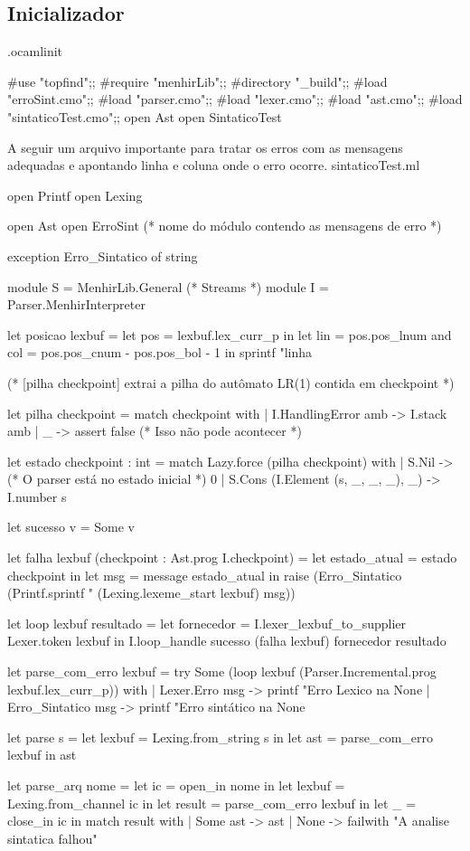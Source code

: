 \documentclass[12pt,a4paper,twoside]{report}
\begin{document}
\subsection{Inicializador} .ocamlinit
\begin{terminal}

#use "topfind";;
#require "menhirLib";;
#directory "_build";;
#load "erroSint.cmo";;
#load "parser.cmo";;
#load "lexer.cmo";;
#load "ast.cmo";;
#load "sintaticoTest.cmo";;
open Ast
open SintaticoTest

\end{terminal}
A seguir um arquivo importante para tratar os erros com as mensagens adequadas e apontando linha e coluna onde o erro ocorre.
sintaticoTest.ml
\begin{terminal}
open Printf
open Lexing

open Ast
open ErroSint (* nome do módulo contendo as mensagens de erro *)

exception Erro_Sintatico of string
    
module S = MenhirLib.General (* Streams *)
module I = Parser.MenhirInterpreter

let posicao lexbuf =
    let pos = lexbuf.lex_curr_p in
    let lin = pos.pos_lnum
    and col = pos.pos_cnum - pos.pos_bol - 1 in
    sprintf "linha %

(* [pilha checkpoint] extrai a pilha do autômato LR(1) contida em checkpoint *)

let pilha checkpoint =
  match checkpoint with
  | I.HandlingError amb -> I.stack amb
  | _ -> assert false (* Isso não pode acontecer *)

let estado checkpoint : int =
  match Lazy.force (pilha checkpoint) with
  | S.Nil -> (* O parser está no estado inicial *)
     0
  | S.Cons (I.Element (s, _, _, _), _) ->
     I.number s

let sucesso v = Some v

let falha lexbuf (checkpoint : Ast.prog I.checkpoint) =
  let estado_atual = estado checkpoint in
  let msg = message estado_atual in
  raise (Erro_Sintatico (Printf.sprintf "%
                                      (Lexing.lexeme_start lexbuf) msg))

let loop lexbuf resultado =
  let fornecedor = I.lexer_lexbuf_to_supplier Lexer.token lexbuf in
  I.loop_handle sucesso (falha lexbuf) fornecedor resultado


let parse_com_erro lexbuf =
  try
    Some (loop lexbuf (Parser.Incremental.prog lexbuf.lex_curr_p))
  with
  | Lexer.Erro msg ->
     printf "Erro Lexico na %
     None
  | Erro_Sintatico msg ->
     printf "Erro sintático na %
     None

let parse s =
  let lexbuf = Lexing.from_string s in
  let ast = parse_com_erro lexbuf in
  ast

let parse_arq nome =
  let ic = open_in nome in
  let lexbuf = Lexing.from_channel ic in
  let result = parse_com_erro lexbuf in
  let _ = close_in ic in
  match result with
  | Some ast -> ast
  | None -> failwith "A analise sintatica falhou"


\end{terminal}
\end{document}
